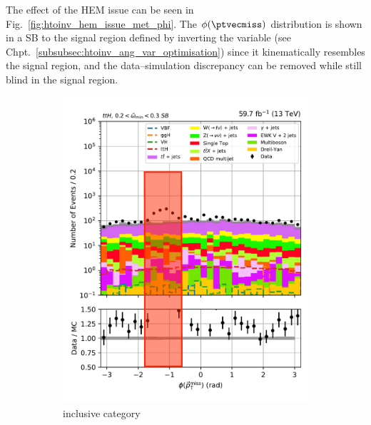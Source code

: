 The effect of the HEM issue can be seen in Fig.~\ref{fig:htoinv_hem_issue_met_phi}. The $\phi(\ptvecmiss)$ distribution is shown in a \gls{SB} to the signal region defined by inverting the \omegaTilde variable (see Chpt.~\ref{subsubsec:htoinv_ang_var_optimisation}) since it kinematically resembles the signal region, and the data--simulation discrepancy can be removed while still blind in the signal region.

\begin{figure}[htbp]
    \centering
    \begin{subfigure}[b]{0.34\textwidth}
        \includegraphics[width=\textwidth]{figures/hem_issue/sideband_4/met_phi/met_phi_ttH_before_annotated.pdf}
        \caption{\ttH inclusive category}
    \end{subfigure}
    \hspace{0.05\textwidth}
    \begin{subfigure}[b]{0.34\textwidth}

\end{subfigure}
\end{figure}

